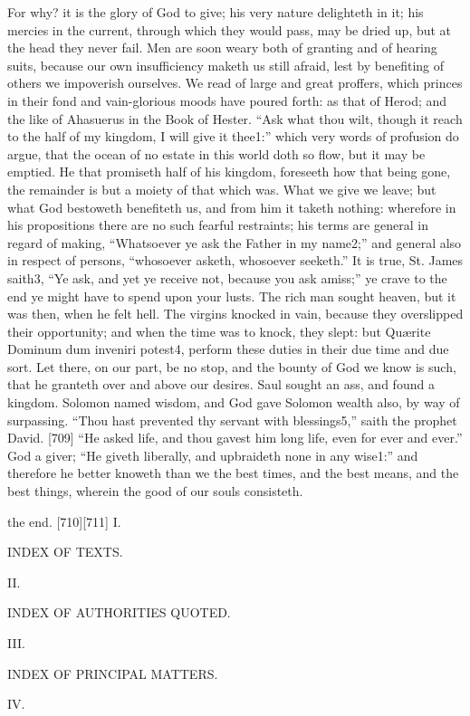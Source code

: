 For why? it is the glory of God to give; his very nature delighteth in it; his mercies in the current, through which they would pass, may be dried up, but at the head they never fail. Men are soon weary both of granting and of hearing suits, because our own insufficiency maketh us still afraid, lest by benefiting of others we impoverish ourselves. We read of large and great proffers, which princes in their fond and vain-glorious moods have poured forth: as that of Herod; and the like of Ahasuerus in the Book of Hester. “Ask what thou wilt, though it reach to the half of my kingdom, I will give it thee1:” which very words of profusion do argue, that the ocean of no estate in this world doth so flow, but it may be emptied. He that promiseth half of his kingdom, foreseeth how that being gone, the remainder is but a moiety of that which was. What we give we leave; but what God bestoweth benefiteth us, and from him it taketh nothing: wherefore in his propositions there are no such fearful restraints; his terms are general in regard of making, “Whatsoever ye ask the Father in my name2;” and general also in respect of persons, “whosoever asketh, whosoever seeketh.” It is true, St. James saith3, “Ye ask, and yet ye receive not, because you ask amiss;” ye crave to the end ye might have to spend upon your lusts. The rich man sought heaven, but it was then, when he felt hell. The virgins knocked in vain, because they overslipped their opportunity; and when the time was to knock, they slept: but Quærite Dominum dum inveniri potest4, perform these duties in their due time and due sort. Let there, on our part, be no stop, and the bounty of God we know is such, that he granteth over and above our desires. Saul sought an ass, and found a kingdom. Solomon named wisdom, and God gave Solomon wealth also, by way of surpassing. “Thou hast prevented thy servant with blessings5,” saith the prophet David. [709] “He asked life, and thou gavest him long life, even for ever and ever.” God a giver; “He giveth liberally, and upbraideth none in any wise1:” and therefore he better knoweth than we the best times, and the best means, and the best things, wherein the good of our souls consisteth.

the end.
[710][711]
I.

INDEX OF TEXTS.

II.

INDEX OF AUTHORITIES QUOTED.

III.

INDEX OF PRINCIPAL MATTERS.

IV.

